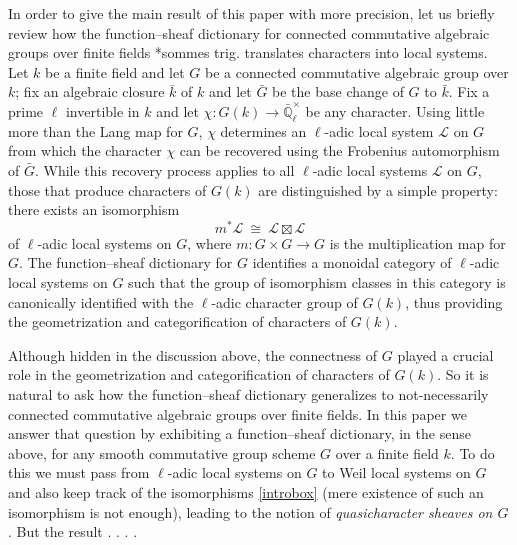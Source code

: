 \documentclass{amsart}
\theoremstyle{plain}
\theoremstyle{definition}
\theoremstyle{remark}
\newcommand{\EE}{\mathbb{\bar Q}_\ell}
\newcommand{\bFq}{\bar{k}}
\newcommand{\Fq}{k}
\newcommand{\EEx}{\EE^\times}
\newcommand{\iso}{{\ \cong\ }}
\newcommand{\qcs}[1]{{\mathcal{#1}}}
\newcommand{\bG}{\bar{G}}
\begin{document}
In order to give the main result of this paper with more precision, let us briefly review how the function--sheaf dictionary for connected commutative algebraic groups over finite fields \cite{deligne:SGA4.5}*{sommes trig.} translates characters into local systems.
Let $\Fq$ be a finite field and let $G$ be a connected commutative algebraic group over $\Fq$; fix an algebraic closure $\bFq$ of $\Fq$
and let $\bG$ be the base change of $G$ to $\bFq$.
Fix a prime $\ell$ invertible in $\Fq$ and let $\chi : G(\Fq) \to \EEx$ be any character.
Using little more than the Lang map for $G$, $\chi$ determines an $\ell$-adic local system $\qcs{L}$ on $G$ from which the character $\chi$ can be recovered using the Frobenius automorphism of $\bG$.
While this recovery process applies to all $\ell$-adic local systems $\qcs{L}$ on $G$, those that produce characters of $G(\Fq)$ are distinguished by a simple property: there exists an isomorphism
\begin{equation}\label{introbox}
m^* \qcs{L} \iso \qcs{L} \boxtimes \qcs{L}
\end{equation}
 of $\ell$-adic local systems on $G$, where $m : G\times G \to G$ is the multiplication map for $G$. The function--sheaf dictionary for $G$ identifies a monoidal category of $\ell$-adic local systems on $G$ such that the group of isomorphism classes in this category is canonically identified with the $\ell$-adic character group of $G(\Fq)$, thus providing the geometrization and categorification of characters of $G(\Fq)$.

Although hidden in the discussion above, the connectness of $G$ played a crucial role in the geometrization and categorification of characters of $G(\Fq)$.  So it is natural to ask how the function--sheaf dictionary generalizes to not-necessarily connected commutative algebraic groups over finite fields. In this paper we answer that question by exhibiting a function--sheaf dictionary, in the sense above, for any smooth commutative group scheme $G$ over a finite field $\Fq$.
To do this we must pass from $\ell$-adic local systems on $G$ to Weil local systems on $G$
and also keep track of the isomorphisms \eqref{introbox} (mere existence of such an isomorphism is not enough), leading to the notion of {\it quasicharacter sheaves on $G$}.
But the result  . . . .
\end{document}
